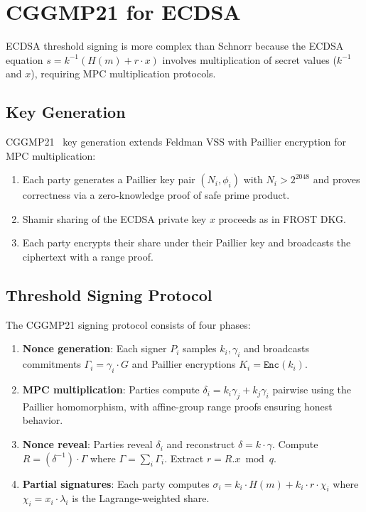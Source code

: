 \section{CGGMP21 for ECDSA}

\label{sec:cggmp}

ECDSA threshold signing is more complex than Schnorr because the ECDSA
equation $s = k^{-1}(H(m) + r \cdot x)$ involves multiplication of secret
values ($k^{-1}$ and $x$), requiring MPC multiplication protocols.

\subsection{Key Generation}

CGGMP21~\cite{cggmp21} key generation extends Feldman VSS with Paillier
encryption for MPC multiplication:
\begin{enumerate}[leftmargin=1.4em]
    \item Each party generates a Paillier key pair $(N_i, \phi_i)$ with
    $N_i > 2^{2048}$ and proves correctness via a zero-knowledge proof of
    safe prime product.
    \item Shamir sharing of the ECDSA private key $x$ proceeds as in FROST DKG.
    \item Each party encrypts their share under their Paillier key and
    broadcasts the ciphertext with a range proof.
\end{enumerate}

\subsection{Threshold Signing Protocol}

The CGGMP21 signing protocol consists of four phases:

\begin{enumerate}[leftmargin=1.4em]
    \item \textbf{Nonce generation}: Each signer $P_i$ samples $k_i, \gamma_i$
    and broadcasts commitments $\Gamma_i = \gamma_i \cdot G$ and Paillier
    encryptions $K_i = \texttt{Enc}(k_i)$.
    \item \textbf{MPC multiplication}: Parties compute $\delta_i = k_i \gamma_j
    + k_j \gamma_i$ pairwise using the Paillier homomorphism, with
    affine-group range proofs ensuring honest behavior.
    \item \textbf{Nonce reveal}: Parties reveal $\delta_i$ and reconstruct
    $\delta = k \cdot \gamma$. Compute $R = (\delta^{-1}) \cdot \Gamma$ where
    $\Gamma = \sum_i \Gamma_i$. Extract $r = R.x \bmod q$.
    \item \textbf{Partial signatures}: Each party computes $\sigma_i = k_i
    \cdot H(m) + k_i \cdot r \cdot \chi_i$ where $\chi_i = x_i \cdot
    \lambda_i$ is the Lagrange-weighted share.
\end{enumerate}

